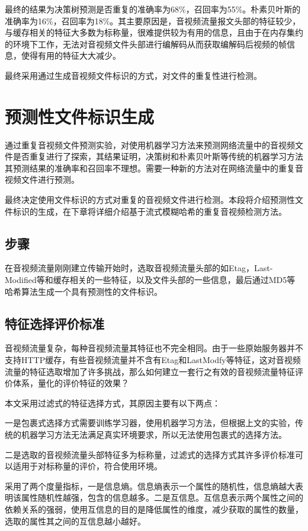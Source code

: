 最终的结果为决策树预测是否重复的准确率为68\%，召回率为55\%。朴素贝叶斯的准确率为16\%，召回率为18\%。其主要原因是，音视频流量报文头部的特征较少，与缓存相关的特征大多数为标称量，很难提供较为有用的信息，且由于在内存集约的环境下工作，无法对音视频文件头部进行编解码从而获取编解码后视频的帧信息，使得有用的特征大大减少。

最终采用通过生成音视频文件标识的方式，对文件的重复性进行检测。

\section{预测性文件标识生成}
通过重复音视频文件预测实验，对使用机器学习方法来预测网络流量中的音视频文件是否重复进行了探索，其结果证明，决策树和朴素贝叶斯等传统的机器学习方法其预测结果的准确率和召回率不理想。需要一种新的方法对在网络流量中的重复音视频文件进行预测。

最终决定使用文件标识的方式对重复的音视频文件进行检测。本段将介绍预测性文件标识的生成，在下章将详细介绍基于流式模糊哈希的重复音视频检测方法。

\subsection{步骤}
在音视频流量刚刚建立传输开始时，选取音视频流量头部的如Etag，Last-Modified等和缓存相关的一些特征，以及文件头部的一些信息，最后通过MD5等哈希算法生成一个具有预测性的文件标识。

\subsection{特征选择评价标准}
音视频流量复杂，每种音视频流量其特征也不完全相同。由于一些原始服务器并不支持HTTP缓存，有些音视频流量并不含有Etag和LastModfy等特征，这对音视频流量的特征选取增加了许多挑战，那么如何建立一套行之有效的音视频流量特征评价体系，量化的评价特征的效果？

本文采用过滤式的特征选择方式，其原因主要有以下两点：

一是包裹式选择方式需要训练学习器，使用机器学习方法，但根据上文的实验，传统的机器学习方法无法满足真实环境要求，所以无法使用包裹式的选择方法。

二是选取的音视频流量头部特征多为标称量，过滤式的选择方式其许多评价标准可以适用于对标称量的评价，符合使用环境。

采用了两个度量指标，一是信息熵。信息熵表示一个属性的随机性，信息熵越大表明该属性随机性越强，包含的信息越多。二是互信息。互信息表示两个属性之间的依赖关系的强弱，使用互信息的目的是降低属性的维度，减少获取的属性的数量，选取的属性其之间的互信息越小越好。

